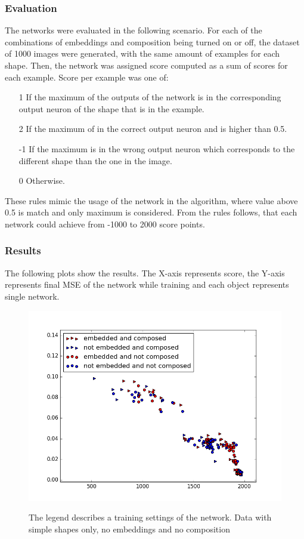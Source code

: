 \subsubsection{Evaluation}
The networks were evaluated in the following scenario. For each of the combinations of embeddings and composition being turned on or off, the dataset of 1000 images were generated, with the same amount of examples for each shape. Then, the network was assigned score computed as a sum of scores for each example. Score per example was one of: 
\begin{enumerate}
\item [1] If the maximum of the outputs of the network is in the corresponding output neuron of the shape that is in the example.
\item [2] If the maximum of in the correct output neuron and is higher than 0.5.
\item [-1] If the maximum is in the wrong output neuron which corresponds to the different shape than the one in the image.
\item [0] Otherwise.  
\end{enumerate}
These rules mimic the usage of the network in the algorithm, where value above 0.5 is match and only maximum is considered. From the rules follows, that each network could achieve from -1000 to 2000 score points. 
\subsubsection{Results}
The following plots show the results. The X-axis represents score, the Y-axis represents final MSE of the network while training and each object represents single network.

\begin{figure}[!htb]
\begin{center}
\label{fig:simples_com}
\includegraphics[width=\linewidth]{ext/figure_simples_com.png}
\end{center}
	\centering
	\caption{The legend describes a training settings of the network. Data with simple shapes only, no embeddings and no composition}
\end{figure}




